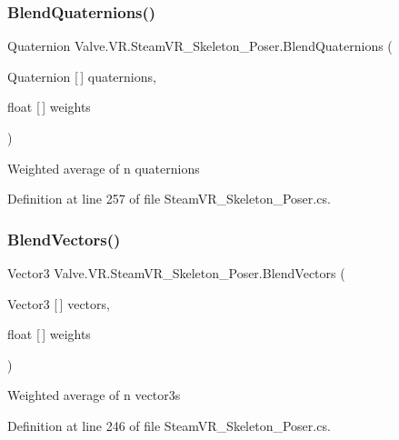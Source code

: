 \subsubsection{\texorpdfstring{BlendQuaternions()}{BlendQuaternions()}}
{\footnotesize\ttfamily Quaternion Valve.\+V\+R.\+Steam\+V\+R\+\_\+\+Skeleton\+\_\+\+Poser.\+Blend\+Quaternions (\begin{DoxyParamCaption}\item[{Quaternion \mbox{[}$\,$\mbox{]}}]{quaternions,  }\item[{float \mbox{[}$\,$\mbox{]}}]{weights }\end{DoxyParamCaption})\hspace{0.3cm}{\ttfamily [protected]}}



Weighted average of n quaternions 



Definition at line 257 of file Steam\+V\+R\+\_\+\+Skeleton\+\_\+\+Poser.\+cs.

\mbox{\label{class_valve_1_1_v_r_1_1_steam_v_r___skeleton___poser_adc9b5a7251967eda89384cd100a12706}} 
\subsubsection{\texorpdfstring{BlendVectors()}{BlendVectors()}}
{\footnotesize\ttfamily Vector3 Valve.\+V\+R.\+Steam\+V\+R\+\_\+\+Skeleton\+\_\+\+Poser.\+Blend\+Vectors (\begin{DoxyParamCaption}\item[{Vector3 \mbox{[}$\,$\mbox{]}}]{vectors,  }\item[{float \mbox{[}$\,$\mbox{]}}]{weights }\end{DoxyParamCaption})\hspace{0.3cm}{\ttfamily [protected]}}



Weighted average of n vector3s 



Definition at line 246 of file Steam\+V\+R\+\_\+\+Skeleton\+\_\+\+Poser.\+cs.

\mbox{\label{class_valve_1_1_v_r_1_1_steam_v_r___skeleton___poser_a0decc52524d496af9eeff38c8d9f1dab}} 
